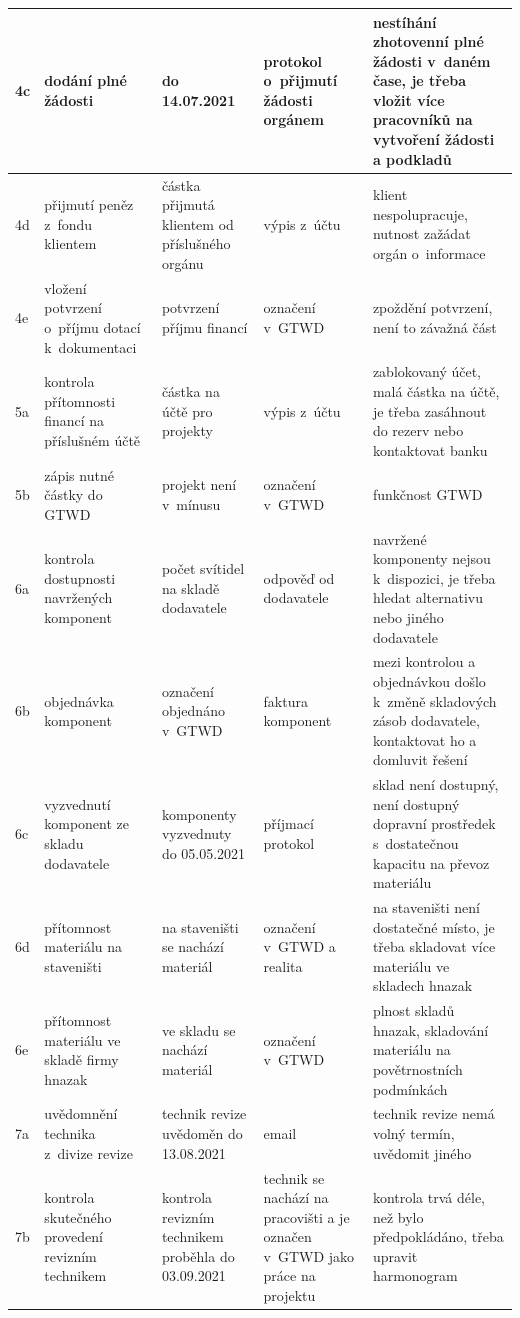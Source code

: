 \documentclass[a4paper, twoside, 11pt]{article}
\begin{document}
\begin{table}[H]
{\begin{tabular}{ !{\vrule width 2pt} p{5cm} | p{5cm} | p{5cm} | p{5cm} | p{5cm} !{\vrule width 2pt} }
	4c & dodání plné žádosti & do 14.07.2021 & protokol o~přijmutí žádosti orgánem & nestíhání zhotovenní plné žádosti v~daném čase, je třeba vložit více pracovníků na vytvoření žádosti a podkladů  \\ \hline
	4d & přijmutí peněz z~fondu klientem & částka přijmutá klientem od příslušného orgánu & výpis z~účtu & klient nespolupracuje, nutnost zažádat orgán o~informace   \\ \hline
	4e & vložení potvrzení o~příjmu dotací k~dokumentaci & potvrzení příjmu financí & označení v~GTWD & zpoždění potvrzení, není to závažná část  \\ \hline
	5a & kontrola přítomnosti financí na příslušném účtě & částka na účtě pro projekty & výpis z~účtu & zablokovaný účet, malá částka na účtě, je třeba zasáhnout do rezerv nebo kontaktovat banku  \\ \hline
	5b & zápis nutné částky do GTWD & projekt není v~mínusu & označení v~GTWD & funkčnost GTWD   \\ \hline
	6a & kontrola dostupnosti navržených komponent & počet svítidel na skladě dodavatele & odpověď od dodavatele & navržené komponenty nejsou k~dispozici, je třeba hledat alternativu nebo jiného dodavatele   \\ \hline
	6b & objednávka komponent & označení objednáno v~GTWD & faktura komponent & mezi kontrolou a objednávkou došlo k~změně skladových zásob dodavatele, kontaktovat ho a domluvit řešení     \\ \hline
	6c & vyzvednutí komponent ze skladu dodavatele & komponenty vyzvednuty do 05.05.2021 & příjmací protokol & sklad není dostupný, není dostupný dopravní prostředek s~dostatečnou kapacitu na převoz materiálu  \\ \hline
	6d & přítomnost materiálu na staveništi & na staveništi se nachází materiál & označení v~GTWD a realita & na staveništi není dostatečné místo, je třeba skladovat více materiálu ve skladech hnazak   \\ \hline
	6e & přítomnost materiálu ve skladě firmy hnazak & ve skladu se nachází materiál & označení v~GTWD &plnost skladů hnazak, skladování materiálu na povětrnostních podmínkách  \\ \hline
	7a & uvědomnění technika z~divize revize &technik revize uvědoměn do 13.08.2021 & email & technik revize nemá volný termín, uvědomit jiného   \\ \hline
	7b & kontrola skutečného provedení revizním technikem &kontrola revizním technikem proběhla do 03.09.2021 & technik se nachází na pracovišti a je označen v~GTWD jako práce na projektu & kontrola trvá déle, než bylo předpokládáno, třeba upravit harmonogram   \\ \hline

\end{tabular}}
\end{table}
\end{document}
